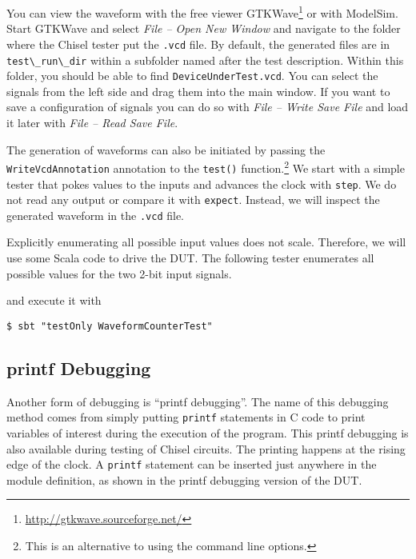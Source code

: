 \documentclass[%
    10pt,
    headinclude, footexclude,
    openright, %
    notitlepage,
    cleardoubleempty,
    headsepline,
    pointlessnumbers,
    bibtotoc, idxtotoc,
    ]{scrbook}
\newcommand{\code}[1]{{\lstinline[basicstyle=\small\ttfamily]{#1}}}
\newcommand{\myref}[2]{\href{#1}{#2}}
\renewcommand{\myref}[2]{{#2}{\footnote{\url{#1}}}}
\begin{document}
You can view the waveform with the free viewer
\myref{http://gtkwave.sourceforge.net/}{GTKWave} or with ModelSim.
Start GTKWave and select \emph{File -- Open New Window} and navigate to the
folder where the Chisel tester put the \code{.vcd} file. By default, the generated files
are in \code{test\_run\_dir} within a subfolder named after the test description.
Within this folder, you should be able to find \code{DeviceUnderTest.vcd}.
You can select the signals from the left side and drag them into the main window.
If you want to save a configuration of signals you can do so with \emph{File -- Write Save File}
and load it later with \emph{File -- Read Save File}.

The generation of waveforms can also be initiated by passing the\\ \code{WriteVcdAnnotation}
annotation to the \code{test()} function.\footnote{This is an alternative to
using the command line options.}
We start with a simple tester that pokes values to the inputs and advances
the clock with \code{step}. We do not read any output or compare it with \code{expect}.
Instead, we will inspect the generated waveform in the \code{.vcd} file.






Explicitly enumerating all possible input values does not scale. Therefore, we will use
some Scala code to drive the DUT. The following tester enumerates all possible values for
the two 2-bit input signals.


\noindent and execute it with

\begin{verbatim}
$ sbt "testOnly WaveformCounterTest"
\end{verbatim}

\subsection{printf Debugging}


Another form of debugging is ``printf debugging''. The name of this debugging method comes from
simply putting \code{printf} statements in C code to print variables of interest during
the execution of the program. This printf debugging is also available during testing
of Chisel circuits. The printing happens at the rising edge of the clock.
A \code{printf} statement can be inserted just anywhere in the module definition,
as shown in the printf debugging version of the DUT.
\end{document}
